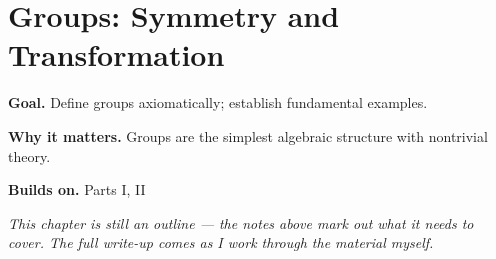 \chapter{Groups: Symmetry and Transformation}
\label{ch:04-abstract-algebra-01}

\begin{chapterintro}
\textbf{Goal.} Define groups axiomatically; establish fundamental examples.

\textbf{Why it matters.} Groups are the simplest algebraic structure with nontrivial theory.

\textbf{Builds on.} Parts I, II
\end{chapterintro}

\textit{This chapter is still an outline --- the notes above mark out what it needs to cover. The full write-up comes as I work through the material myself.}

